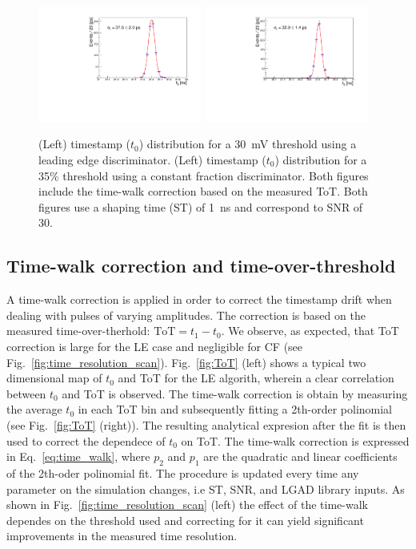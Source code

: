\documentclass[preprint,1p]{elsarticle}
\begin{document}
  \begin{figure}[htbp]
    \centering
    \includegraphics[width=0.48\textwidth]{figs/pre_rad_st_1ns_snr_30_le_tot_threshold_30mV.pdf} \hfill
    \includegraphics[width=0.48\textwidth]{figs/pre_rad_st_1ns_snr_30_cfd_tot_threshold_35_percent_v2.pdf}
    \caption{(Left) timestamp ($t_{0}$) distribution for a 30~\si{mV} threshold using a leading edge discriminator.
    (Left) timestamp ($t_{0}$) distribution for a 35\% threshold using a constant fraction discriminator. Both figures
    include the time-walk correction based on the measured ToT.
    Both figures use a shaping time (ST) of 1~\si{ns} and correspond to SNR of 30.}
    \label{fig:time_res}
  \end{figure}


\subsection{Time-walk correction and time-over-threshold}\label{sec:tw_and_tot}
A time-walk correction is applied in order to correct the timestamp drift when dealing with pulses of varying amplitudes.
The correction is based on the measured time-over-therhold: $\mathrm{ToT} = t_{1} - t_{0}$. We observe, as expected, that ToT correction
is large for the LE case and negligible for CF (see Fig.~\ref{fig:time_resolution_scan}). Fig.~\ref{fig:ToT} (left) shows a typical two dimensional map of $t_{0}$ and ToT for the
LE algorith, wherein a clear correlation between $t_{0}$ and ToT is observed. The time-walk correction is obtain by measuring the average
$t_{0}$ in each ToT bin and subsequently fitting a 2th-order polinomial (see Fig.~\ref{fig:ToT} (right)).
The resulting analytical expresion after the fit is then used to correct the dependece of $t_{0}$ on ToT. The time-walk correction is
expressed in Eq.~\ref{eq:time_walk}, where $p_{2}$ and $p_{1}$ are the quadratic and linear coefficients of the 2th-oder
polinomial fit. The procedure is updated every time any parameter on the simulation changes, i.e ST, SNR, and LGAD library inputs. As
shown in Fig.~\ref{fig:time_resolution_scan} (left) the effect of the time-walk dependes on the threshold used and correcting for it
can yield significant improvements in the measured time resolution.
\end{document}
